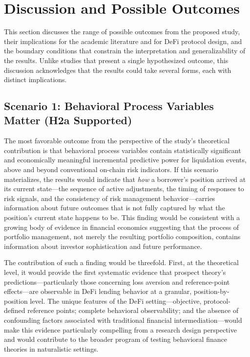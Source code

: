 \section{Discussion and Possible Outcomes}

This section discusses the range of possible outcomes from the proposed study, their implications for the academic literature and for DeFi protocol design, and the boundary conditions that constrain the interpretation and generalizability of the results. Unlike studies that present a single hypothesized outcome, this discussion acknowledges that the results could take several forms, each with distinct implications.

\subsection{Scenario 1: Behavioral Process Variables Matter (H2a Supported)}

The most favorable outcome from the perspective of the study's theoretical contribution is that behavioral process variables contain statistically significant and economically meaningful incremental predictive power for liquidation events, above and beyond conventional on-chain risk indicators. If this scenario materializes, the results would indicate that \emph{how} a borrower's position arrived at its current state—the sequence of active adjustments, the timing of responses to risk signals, and the consistency of risk management behavior—carries information about future outcomes that is not fully captured by what the position's current state happens to be. This finding would be consistent with a growing body of evidence in financial economics suggesting that the process of portfolio management, not merely the resulting portfolio composition, contains information about investor sophistication and future performance.

The contribution of such a finding would be threefold. First, at the theoretical level, it would provide the first systematic evidence that prospect theory's predictions—particularly those concerning loss aversion and reference-point effects—are observable in DeFi lending behavior at a granular, position-by-position level. The unique features of the DeFi setting—objective, protocol-defined reference points; complete behavioral observability; and the absence of confounding factors associated with traditional financial intermediation—would make this evidence particularly compelling from a research design perspective and would contribute to the broader program of testing behavioral finance theories in naturalistic settings.

